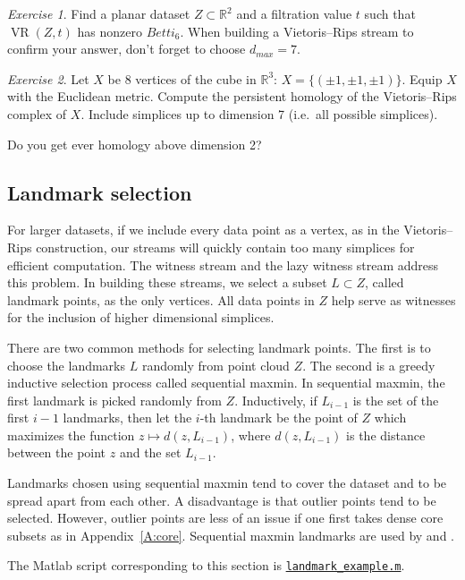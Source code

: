 \documentclass[amscd, amssymb, verbatim]{amsart}[12pt]
\theoremstyle{remark}
\newtheorem{exercise}{Exercise}
\theoremstyle{remark}
\theoremstyle{remark}
\DeclareMathOperator{\VR}{VR}
\newcommand{\R}{\mathbb{R}}
\begin{document}
\begin{exercise}
Find a planar dataset $Z \subset \R^2$ and a filtration value $t$ such that $\VR(Z,t)$ has nonzero $Betti_6$. When building a Vietoris--Rips stream to confirm your answer, don't forget to choose $d_{max} = 7$. 
\end{exercise}

\begin{exercise}
Let $X$ be 8 vertices of the cube in $\R^3$: $X=\{(\pm1, \pm1, \pm1)\}$. Equip $X$ with the Euclidean metric. Compute the persistent homology of the Vietoris--Rips complex of $X$. Include simplices up to dimension 7 (i.e.\ all possible simplices).

Do you get ever homology above dimension 2?
\end{exercise}


\subsection{Landmark selection}\label{SS:landmarks}
For larger datasets, if we include every data point as a vertex, as in the Vietoris--Rips construction, our streams will quickly contain too many simplices for efficient computation. The witness stream and the lazy witness stream address this problem. In building these streams, we select a subset $L \subset Z$, called landmark points, as the only vertices. All data points in $Z$ help serve as witnesses for the inclusion of higher dimensional simplices. 

There are two common methods for selecting landmark points. The first is to choose the landmarks $L$ randomly from point cloud $Z$. The second is a greedy inductive selection process called sequential maxmin. In sequential maxmin, the first landmark is picked randomly from $Z$. Inductively, if $L_{i-1}$ is the set of the first $i-1$ landmarks, then let the $i$-th landmark be the point of $Z$ which maximizes the function $z \mapsto d(z, L_{i-1})$, where $d(z, L_{i-1})$ is the distance between the point $z$ and the set $L_{i-1}$. 

Landmarks chosen using sequential maxmin tend to cover the dataset and to be spread apart from each other. A disadvantage is that outlier points tend to be selected. However, outlier points are less of an issue if one first takes dense core subsets as in Appendix~\ref{A:core}. Sequential maxmin landmarks are used by \citet{Range} and \citet{KleinBottle}. 

The Matlab script corresponding to this section is \href{https://github.com/appliedtopology/javaplex/tree/master/src/matlab/for_distribution/tutorial_examples/landmark_example.m}{\texttt{landmark\_example.m}}.
\end{document}
